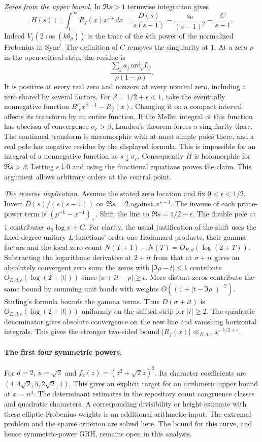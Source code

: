 \emph{Zeros from the upper bound.}
In $\Re s>1$ termwise integration gives
\[
 H(s):=\int_1^\infty R_f(x)x^{-s}\,dx
  =\frac{D(s)}{s(s-1)}-\frac{a_0}{(s-1)^2}-\frac C{s-1}.
\]
Indeed $V_j(2\cos(k\theta_p))$ is the trace of the $k$th power of
the normalized Frobenius in $\mathrm{Sym}^j$. The definition of $C$
removes the singularity at $1$. At a zero $\rho$ in the open critical strip,
the residue is
\[
 \frac{\sum_j a_j\,\mathrm{ord}_{\rho}L_j}{\rho(1-\rho)}.
\]
It is positive at every real zero and nonzero at every nonreal zero,
including a zero shared by several factors.
For $\beta=1/2+\epsilon<1$, take the eventually nonnegative function
$B'_\epsilon x^{\beta-1}-R_f(x)$. Changing it on a compact interval
affects its transform by an entire function. If the Mellin integral of
this function has abscissa of convergence $\sigma_c>\beta$, Landau's
theorem forces a singularity there. The continued transform is meromorphic
with at most simple poles there, and a real pole has negative residue
by the displayed formula. This is impossible for an integral of a
nonnegative function as $s\downarrow\sigma_c$.
Consequently $H$ is holomorphic for $\Re s>\beta$. Letting
$\epsilon\downarrow0$ and using the functional equations proves the claim.
This argument allows arbitrary orders at the central point.

\emph{The reverse implication.}
Assume the stated zero location and fix $0<\epsilon<1/2$.
Invert $D(s)/(s(s-1))$ on $\Re s=2$ against $x^{s-1}$.
The inverse of each prime-power term is $(p^{-k}-x^{-1})_+$.
Shift the line to $\Re s=1/2+\epsilon$. The double pole at $1$
contributes $a_0\log x+C$. For clarity, the usual justification of
the shift uses the fixed-degree unitary $L$-functions' order-one Hadamard
products, their gamma factors and the local zero count
$N(T+1)-N(T)=O_{E,d}(\log(2+T))$.
Subtracting the logarithmic derivative at $2+it$ from that at
$\sigma+it$ gives an absolutely convergent zero sum: the zeros with
$|\Im\rho-t|\le1$ contribute $O_{E,d,\epsilon}(\log(2+|t|))$ since
$|\sigma+it-\rho|\ge\epsilon$. More distant zeros contribute the same
bound by summing unit bands with weights $O((1+|t-\Im\rho|)^{-2})$.
Stirling's formula bounds the gamma terms. Thus $D(\sigma+it)$ is
$O_{E,d,\epsilon}(\log(2+|t|))$ uniformly on the shifted strip for
$|t|\ge2$. The quadratic denominator gives absolute convergence on the
new line and vanishing horizontal integrals. This gives the stronger
two-sided bound $|R_f(x)|\ll_{E,d,\epsilon} x^{-1/2+\epsilon}$.

\paragraph{The first four symmetric powers.}
For $d=2$, $u=\sqrt2$ and $f_2(z)=(z^2+\sqrt2 z)^2$.
Its character coefficients are $(4,4\sqrt2,5,2\sqrt2,1)$.
This gives an explicit target for an arithmetic upper bound at $x=n^4$.
The determinant estimates in the repository count congruence classes and
quadratic characters. A corresponding divisibility or height estimate
with these elliptic Frobenius weights is an additional arithmetic input.
The extremal problem and the sparse criterion are solved here. The bound
for this curve, and hence symmetric-power GRH, remains open in this analysis.

